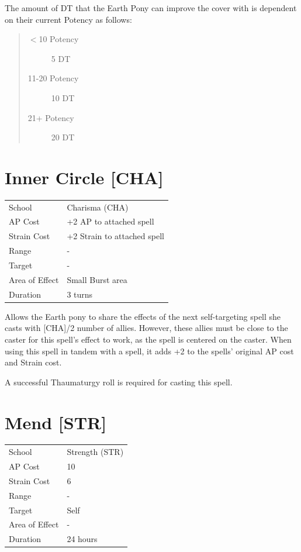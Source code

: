 \documentclass[11pt,a4paper,twocolumn]{book}
\begin{document}
The amount of DT that the Earth Pony can improve the cover with is dependent on their current Potency as follows:

\begin{quote}
  \begin{description}
    \item[$<$10 Potency] 	5 DT
    \item[11-20 Potency] 	10 DT
    \item[21+ Potency] 	20 DT
  \end{description}
\end{quote}


\section*{Inner Circle [CHA]}
{
	\begin{tabu} to 75mm{| X[l,4] | X[l,7] |}
		\hline
		School 			& Charisma (CHA) 	\\
        AP Cost	      	& +2 AP to attached spell 				\\
        Strain Cost     & +2 Strain to attached spell 			\\
        Range     		& - 				\\
        Target      	& - 				\\
        Area of Effect  & Small Burst area 	\\
        Duration     	& 3 turns 			\\ \hline
	\end{tabu}
		
}

\medskip

Allows the Earth pony to share the effects of the next self-targeting spell she casts with [CHA]/2 number of allies. However, these allies must be close to the caster for this spell's effect to work, as the spell is centered on the caster. When using this spell in tandem with a spell, it adds +2 to the spells' original AP cost and Strain cost.

A successful Thaumaturgy roll is required for casting this spell.


\section*{Mend [STR]}
{
	\begin{tabu} to 75mm{| X[l,4] | X[l,7] |}
		\hline
		School 			& Strength (STR) 	\\
        AP Cost	      	& 10 				\\
        Strain Cost     & 6 				\\
        Range     		& - 				\\
        Target      	& Self 				\\
        Area of Effect  & - 	 			\\
        Duration     	& 24 hours 			\\ \hline
	\end{tabu}
		
}
\end{document}
